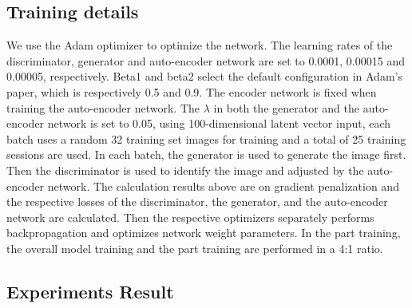 \subsection{Training details}
We use the Adam optimizer to optimize the network. The learning rates of the discriminator, generator and auto-encoder network are set to 0.0001, 0.00015 and 0.00005, respectively.
 Beta1 and beta2 select the default configuration in Adam's paper, which is respectively 0.5 and 0.9. The encoder network is fixed when training the auto-encoder network.
  The $\lambda$ in both the generator and the auto-encoder network is set to 0.05, using 100-dimensional latent vector input, each batch uses a random 32 training set images for training and a total of 25 training sessions are used. 
 In each batch, the generator is used to generate the image first. Then the discriminator is used to identify the image and adjusted by the auto-encoder network.
 The calculation results above are on gradient penalization and the respective losses of the discriminator, the generator, and the auto-encoder network are calculated. Then the respective optimizers separately performs backpropagation and optimizes network weight parameters. In the part training, the overall model training and the part training are performed in a 4:1 ratio.

\subsection{Experiments Result}
